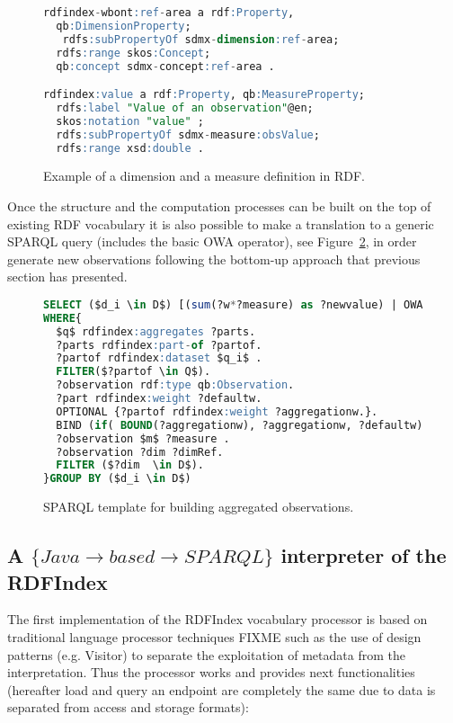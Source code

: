 \begin{figure}[!ht]
\begin{lstlisting}[language=SQL]  
rdfindex-wbont:ref-area a rdf:Property, 
  qb:DimensionProperty; 
   rdfs:subPropertyOf sdmx-dimension:ref-area; 
  rdfs:range skos:Concept; 
  qb:concept sdmx-concept:ref-area . 

rdfindex:value a rdf:Property, qb:MeasureProperty;
  rdfs:label "Value of an observation"@en;
  skos:notation "value" ;
  rdfs:subPropertyOf sdmx-measure:obsValue;
  rdfs:range xsd:double . 
\end{lstlisting}
\caption{Example of a dimension and a measure definition in RDF.}
 \label{fig:results-rdf-properties}
\end{figure}


Once the structure and the computation processes can be built on the top of existing RDF vocabulary it is also 
possible to make a translation to a generic SPARQL query (includes the basic OWA operator), see Figure~\ref{fig:results-rdf-sparql-template}, in order generate new observations following the bottom-up approach that previous section has presented.

\begin{figure}[!ht]
\begin{lstlisting}[language=SQL,mathescape]  
SELECT ($d_i \in D$) [(sum(?w*?measure) as ?newvalue) | OWA(?measure)]
WHERE{
  $q$ rdfindex:aggregates ?parts.
  ?parts rdfindex:part-of ?partof.
  ?partof rdfindex:dataset $q_i$ .
  FILTER($?partof \in Q$).  
  ?observation rdf:type qb:Observation.
  ?part rdfindex:weight ?defaultw.     
  OPTIONAL {?partof rdfindex:weight ?aggregationw.}.
  BIND (if( BOUND(?aggregationw), ?aggregationw, ?defaultw) AS ?w)
  ?observation $m$ ?measure . 
  ?observation ?dim ?dimRef. 
  FILTER ($?dim  \in D$).
}GROUP BY ($d_i \in D$)
\end{lstlisting}
\caption{SPARQL template for building aggregated observations.}
 \label{fig:results-rdf-sparql-template}
\end{figure}


\subsection{A $\{Java\rightarrow based \rightarrow SPARQL\}$  interpreter of the RDFIndex}
The first implementation of the RDFIndex vocabulary processor is based on traditional 
language processor techniques FIXME such as the use of design patterns (e.g. Visitor) 
to separate the exploitation of metadata from the interpretation. Thus the processor 
works and provides next functionalities (hereafter load and query an endpoint are completely the same due to 
data is separated from access and storage formats):

